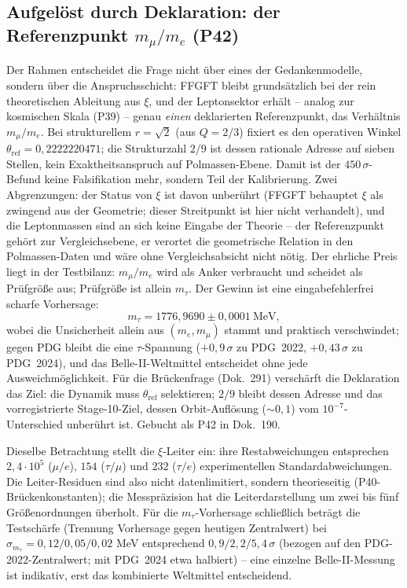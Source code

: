 \subsection{Aufgelöst durch Deklaration: der Referenzpunkt $m_\mu/m_e$ (P42)}
Der Rahmen entscheidet die Frage nicht über eines der Gedankenmodelle,
sondern über die Anspruchsschicht: FFGFT bleibt grundsätzlich bei der rein
theoretischen Ableitung aus $\xi$, und der Leptonsektor erhält -- analog zur
kosmischen Skala (P39) -- genau \emph{einen} deklarierten Referenzpunkt,
das Verhältnis $m_\mu/m_e$. Bei strukturellem $r=\sqrt2$ (aus $Q=2/3$)
fixiert es den operativen Winkel $\theta_{\text{ref}}=0{,}2222220471$;
die Strukturzahl $2/9$ ist dessen rationale Adresse auf sieben Stellen,
kein Exaktheitsanspruch auf Polmassen-Ebene. Damit ist der
$450\,\sigma$-Befund keine Falsifikation mehr, sondern Teil der
Kalibrierung. Zwei Abgrenzungen: der Status von $\xi$ ist davon unberührt
(FFGFT behauptet $\xi$ als zwingend aus der Geometrie; dieser Streitpunkt
ist hier nicht verhandelt), und die Leptonmassen sind an sich keine Eingabe
der Theorie -- der Referenzpunkt gehört zur Vergleichsebene, er verortet
die geometrische Relation in den Polmassen-Daten und wäre ohne
Vergleichsabsicht nicht nötig. Der ehrliche Preis liegt in der Testbilanz:
$m_\mu/m_e$ wird als Anker verbraucht und scheidet als Prüfgröße aus;
Prüfgröße ist allein $m_\tau$. Der Gewinn ist eine eingabefehlerfrei
scharfe Vorhersage:
\begin{equation}
  m_\tau = 1776{,}9690 \pm 0{,}0001\ \text{MeV},
\end{equation}
wobei die Unsicherheit allein aus $(m_e, m_\mu)$ stammt und praktisch
verschwindet; gegen PDG bleibt die eine $\tau$-Spannung ($+0{,}9\,\sigma$ zu
PDG~2022, $+0{,}43\,\sigma$ zu PDG~2024), und
das Belle-II-Weltmittel entscheidet ohne jede Ausweichmöglichkeit. Für die
Brückenfrage (Dok.~291) verschärft die Deklaration das Ziel: die Dynamik
muss $\theta_{\text{ref}}$ selektieren; $2/9$ bleibt dessen Adresse und
das vorregistrierte Stage-10-Ziel, dessen Orbit-Auflösung ($\sim0{,}1$)
vom $10^{-7}$-Unterschied unberührt ist. Gebucht als P42 in Dok.~190.

Dieselbe Betrachtung stellt die $\xi$-Leiter ein: ihre Restabweichungen
entsprechen $2{,}4\cdot10^{5}$ ($\mu/e$), $154$ ($\tau/\mu$) und $232$
($\tau/e$) experimentellen Standardabweichungen. Die Leiter-Residuen sind
also nicht datenlimitiert, sondern theorieseitig (P40-Brückenkonstanten);
die Messpräzision hat die Leiterdarstellung um zwei bis fünf
Größenordnungen überholt. Für die $m_\tau$-Vorhersage schließlich beträgt
die Testschärfe (Trennung Vorhersage gegen heutigen Zentralwert) bei
$\sigma_{m_\tau}=0{,}12/0{,}05/0{,}02$ MeV entsprechend
$0{,}9/2{,}2/5{,}4\,\sigma$ (bezogen auf den PDG-2022-Zentralwert; mit
PDG~2024 etwa halbiert) -- eine einzelne Belle-II-Messung ist
indikativ, erst das kombinierte Weltmittel entscheidend.

